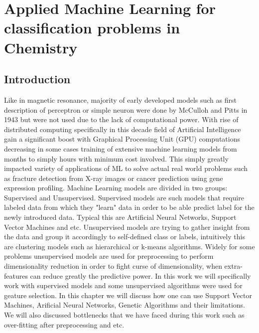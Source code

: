 \chapter{Applied Machine Learning for classification problems in Chemistry}
\section{Introduction}
Like in magnetic resonance, majority of early developed models such as first description of perceptron or simple neuron were done by McCulloh and Pitts in 1943\cite{McCulloch1943} but were not used due to the lack of computational power. With rise of distributed computing specifically in this decade field of Artificial Intelligence gain a significant boost with Graphical Processing Unit (GPU) computations decreasing in some cases training of extensive machine learning models from months to simply hours with minimum cost involved. This simply greatly impacted variety of applications of ML to solve actual real world problems such as fracture detection from X-ray images\cite{Tian2003} or cancer prediction using gene expression profiling\cite{khan:2001}. Machine Learning models are divided in two groups: Supervised and Unsupervised. Supervised models are such models that require labeled data from which they "learn" data in order to be able predict label for the newly introduced data. Typical this are Artificial Neural Networks, Support Vector Machines and etc. Unsupervised models are trying to gather insight from the data and group it accordingly to self-defined class or labels, intuitively this are clustering models such as hierarchical or k-means algorithms. Widely for some problems unsupervised models are used for preprocessing to perform dimensionality reduction in order to fight curse of dimensionality, when extra-features can reduce greatly the predictive power. In this work we will specifically work with supervised models and some unsupervised algorithms were used for geature selection. In this chapter we will discuss how one can use Support Vector Machines, Arificial Neural Networks, Genetic Algorithms and their limitations. We will also discussed bottlenecks that we have faced during this work such as over-fitting after preprocessing and etc. 
